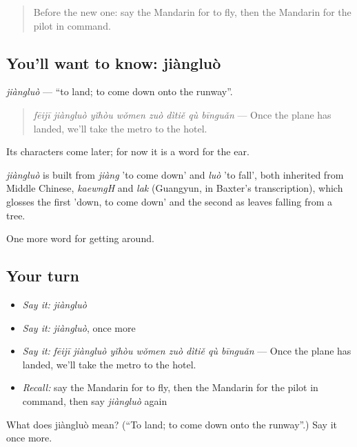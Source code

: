 \label{lesson:ZH-C413-jiangluo}



\begin{quote}
Before the new one: say the Mandarin for to fly, then the Mandarin for the pilot in command.
\end{quote}

\subsection*{You'll want to know: jiàngluò}
\emph{jiàngluò} — \textquotedblleft{}to land; to come down onto the runway\textquotedblright{}.

\begin{quote}
\emph{fēijī jiàngluò yǐhòu wǒmen zuò dìtiě qù bīnguǎn} — Once the plane has landed, we'll take the metro to the hotel.
\end{quote}

Its characters come later; for now it is a word for the ear.

\begin{cousinweb}
\emph{jiàngluò} is built from \emph{jiàng} 'to come down' and \emph{luò} 'to fall', both inherited from Middle Chinese, \emph{kaewngH} and \emph{lak} (Guangyun, in Baxter's transcription), which glosses the first 'down, to come down' and the second as leaves falling from a tree.
\end{cousinweb}

\begin{grammarlens}[title={What you've built}]
One more word for getting around.
\end{grammarlens}

\subsection*{Your turn}
\begin{itemize}
\raggedright
  \item \emph{Say it:} \emph{jiàngluò}
  \item \emph{Say it:} \emph{jiàngluò}, once more
  \item \emph{Say it:} \emph{fēijī jiàngluò yǐhòu wǒmen zuò dìtiě qù bīnguǎn} — Once the plane has landed, we'll take the metro to the hotel.
  \item \emph{Recall:} say the Mandarin for to fly, then the Mandarin for the pilot in command, then say \emph{jiàngluò} again
\end{itemize}

\begin{tcolorbox}[breakable,colback=teal!4,colframe=teal!35!black,title={Before you move on}]
What does jiàngluò mean? (\textquotedblleft{}To land; to come down onto the runway\textquotedblright{}.) Say it once more.
\end{tcolorbox}
